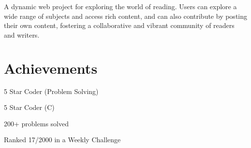 \documentclass[]{deedy-resume-openfont}
\begin{document}
\begin{minipage}[t]{0.66\textwidth}
\begin{tightemize}
\item A dynamic web project for exploring the world of reading. Users can explore a wide range of subjects and access rich content, and can also contribute by posting their own content, fostering a collaborative and vibrant community of readers and writers.
\end{tightemize}
\sectionsep

\section{Achievements}

\begin{tightemize}
\item 5 Star Coder (Problem Solving)
\item 5 Star Coder (C)
\end{tightemize}
\sectionsep

\begin{tightemize}
\item 200+ problems solved
\item Ranked 17/2000 in a Weekly Challenge
\end{tightemize}
\sectionsep

\end{minipage}
\end{document}
